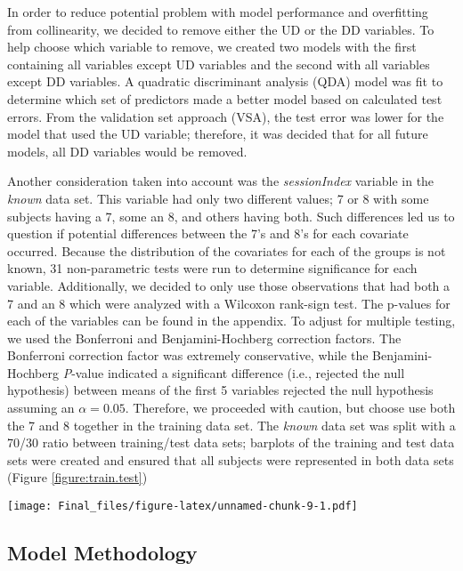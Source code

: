 \documentclass[]{article}
\let\origfigure\figure
\let\endorigfigure\endfigure
\renewenvironment{figure}[1][2] {
    \expandafter\origfigure\expandafter[H]
} {
    \endorigfigure
}
\begin{document}
In order to reduce potential problem with model performance and
overfitting from collinearity, we decided to remove either the UD or the
DD variables. To help choose which variable to remove, we created two
models with the first containing all variables except UD variables and
the second with all variables except DD variables. A quadratic
discriminant analysis (QDA) model was fit to determine which set of
predictors made a better model based on calculated test errors. From the
validation set approach (VSA), the test error was lower for the model
that used the UD variable; therefore, it was decided that for all future
models, all DD variables would be removed.

Another consideration taken into account was the \emph{sessionIndex}
variable in the \emph{known} data set. This variable had only two
different values; 7 or 8 with some subjects having a 7, some an 8, and
others having both. Such differences led us to question if potential
differences between the 7's and 8's for each covariate occurred. Because
the distribution of the covariates for each of the groups is not known,
31 non-parametric tests were run to determine significance for each
variable. Additionally, we decided to only use those observations that
had both a 7 and an 8 which were analyzed with a Wilcoxon rank-sign
test. The p-values for each of the variables can be found in the
appendix. To adjust for multiple testing, we used the Bonferroni and
Benjamini-Hochberg correction factors. The Bonferroni correction factor
was extremely conservative, while the Benjamini-Hochberg \emph{P}-value
indicated a significant difference (i.e., rejected the null hypothesis)
between means of the first 5 variables rejected the null hypothesis
assuming an \(\alpha = 0.05\). Therefore, we proceeded with caution, but
choose use both the 7 and 8 together in the training data set. The
\emph{known} data set was split with a 70/30 ratio between training/test
data sets; barplots of the training and test data sets were created and
ensured that all subjects were represented in both data sets (Figure
\ref{figure:train.test})

\begin{figure}
\centering
\texttt{[image: Final\_files/figure-latex/unnamed-chunk-9-1.pdf]}
\caption{Barplots of number of subject observations included in the
known, training, and test, datasets. \label{figure:train.test}}
\end{figure}

\subsection{Model Methodology}\label{model-methodology}
\end{document}
